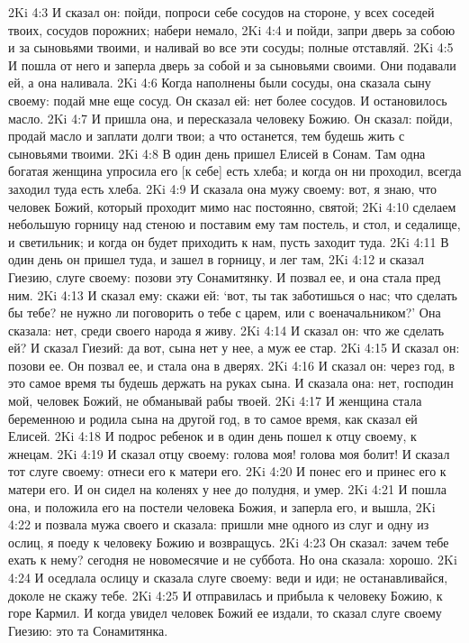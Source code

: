 2Ki 4:3  И сказал он: пойди, попроси себе сосудов на стороне, у всех соседей твоих, сосудов порожних; набери немало,
2Ki 4:4  и пойди, запри дверь за собою и за сыновьями твоими, и наливай во все эти сосуды; полные отставляй.
2Ki 4:5  И пошла от него и заперла дверь за собой и за сыновьями своими. Они подавали ей, а она наливала.
2Ki 4:6  Когда наполнены были сосуды, она сказала сыну своему: подай мне еще сосуд. Он сказал ей: нет более сосудов. И остановилось масло.
2Ki 4:7  И пришла она, и пересказала человеку Божию. Он сказал: пойди, продай масло и заплати долги твои; а что останется, тем будешь жить с сыновьями твоими.
2Ki 4:8  В один день пришел Елисей в Сонам. Там одна богатая женщина упросила его [к себе] есть хлеба; и когда он ни проходил, всегда заходил туда есть хлеба.
2Ki 4:9  И сказала она мужу своему: вот, я знаю, что человек Божий, который проходит мимо нас постоянно, святой;
2Ki 4:10  сделаем небольшую горницу над стеною и поставим ему там постель, и стол, и седалище, и светильник; и когда он будет приходить к нам, пусть заходит туда.
2Ki 4:11  В один день он пришел туда, и зашел в горницу, и лег там,
2Ki 4:12  и сказал Гиезию, слуге своему: позови эту Сонамитянку. И позвал ее, и она стала пред ним.
2Ki 4:13  И сказал ему: скажи ей: `вот, ты так заботишься о нас; что сделать бы тебе? не нужно ли поговорить о тебе с царем, или с военачальником?' Она сказала: нет, среди своего народа я живу.
2Ki 4:14  И сказал он: что же сделать ей? И сказал Гиезий: да вот, сына нет у нее, а муж ее стар.
2Ki 4:15  И сказал он: позови ее. Он позвал ее, и стала она в дверях.
2Ki 4:16  И сказал он: через год, в это самое время ты будешь держать на руках сына. И сказала она: нет, господин мой, человек Божий, не обманывай рабы твоей.
2Ki 4:17  И женщина стала беременною и родила сына на другой год, в то самое время, как сказал ей Елисей.
2Ki 4:18  И подрос ребенок и в один день пошел к отцу своему, к жнецам.
2Ki 4:19  И сказал отцу своему: голова моя! голова моя болит! И сказал тот слуге своему: отнеси его к матери его.
2Ki 4:20  И понес его и принес его к матери его. И он сидел на коленях у нее до полудня, и умер.
2Ki 4:21  И пошла она, и положила его на постели человека Божия, и заперла его, и вышла,
2Ki 4:22  и позвала мужа своего и сказала: пришли мне одного из слуг и одну из ослиц, я поеду к человеку Божию и возвращусь.
2Ki 4:23  Он сказал: зачем тебе ехать к нему? сегодня не новомесячие и не суббота. Но она сказала: хорошо.
2Ki 4:24  И оседлала ослицу и сказала слуге своему: веди и иди; не останавливайся, доколе не скажу тебе.
2Ki 4:25  И отправилась и прибыла к человеку Божию, к горе Кармил. И когда увидел человек Божий ее издали, то сказал слуге своему Гиезию: это та Сонамитянка.
